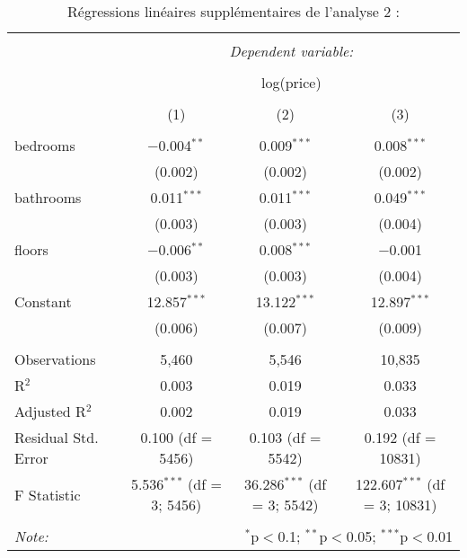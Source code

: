 \documentclass[
  11pt,
  french,
]{article}
\begin{document}
\begin{table}[!htbp] \centering 
  \caption{Régressions linéaires supplémentaires de l'analyse 2 :} 
  \label{} 
\small 
\begin{tabular}{@{\extracolsep{1pt}}lccc} 
\\[-1.8ex]\hline 
\hline \\[-1.8ex] 
 & \multicolumn{3}{c}{\textit{Dependent variable:}} \\ 
\cline{2-4} 
\\[-1.8ex] & \multicolumn{3}{c}{log(price)} \\ 
\\[-1.8ex] & (1) & (2) & (3)\\ 
\hline \\[-1.8ex] 
 bedrooms & $-$0.004$^{**}$ & 0.009$^{***}$ & 0.008$^{***}$ \\ 
  & (0.002) & (0.002) & (0.002) \\ 
  bathrooms & 0.011$^{***}$ & 0.011$^{***}$ & 0.049$^{***}$ \\ 
  & (0.003) & (0.003) & (0.004) \\ 
  floors & $-$0.006$^{**}$ & 0.008$^{***}$ & $-$0.001 \\ 
  & (0.003) & (0.003) & (0.004) \\ 
  Constant & 12.857$^{***}$ & 13.122$^{***}$ & 12.897$^{***}$ \\ 
  & (0.006) & (0.007) & (0.009) \\ 
 \hline \\[-1.8ex] 
Observations & 5,460 & 5,546 & 10,835 \\ 
R$^{2}$ & 0.003 & 0.019 & 0.033 \\ 
Adjusted R$^{2}$ & 0.002 & 0.019 & 0.033 \\ 
Residual Std. Error & 0.100 (df = 5456) & 0.103 (df = 5542) & 0.192 (df = 10831) \\ 
F Statistic & 5.536$^{***}$ (df = 3; 5456) & 36.286$^{***}$ (df = 3; 5542) & 122.607$^{***}$ (df = 3; 10831) \\ 
\hline 
\hline \\[-1.8ex] 
\textit{Note:}  & \multicolumn{3}{r}{$^{*}$p$<$0.1; $^{**}$p$<$0.05; $^{***}$p$<$0.01} \\ 
\end{tabular} 
\end{table}
\end{document}
